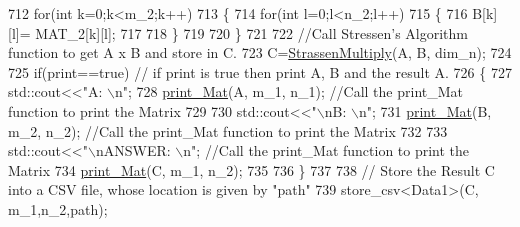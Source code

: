 \begin{DoxyCode}
712                                                         \textcolor{keywordflow}{for}(\textcolor{keywordtype}{int} k=0;k<m\_2;k++)
713                                                         \{
714                                                                 \textcolor{keywordflow}{for}(\textcolor{keywordtype}{int} l=0;l<n\_2;l++)
715                                                                 \{
716                                                                         B[k][l]= MAT\_2[k][l];
717 
718                                                                 \}
719 
720                                                         \}
721 
722                                                 \textcolor{comment}{//Call Stressen's Algorithm function to get A x B and store
       in C.}
723                                                         C=\hyperlink{classMATOPS_1_1BigMatrix_a71c665c80a1ca3731bd0d8ce37f0ace1}{StrassenMultiply}(A, B, dim\_n);
724 
725                                         \textcolor{keywordflow}{if}(print==\textcolor{keyword}{true}) \textcolor{comment}{// if print is true then print A, B and the result
       A.}
726                                                 \{
727                                                                 std::cout<<\textcolor{stringliteral}{"A: \(\backslash\)n"};
728                                                                 \hyperlink{classMATOPS_1_1BigMatrix_af5223558c09e6c3c2fd3bcc5ccd08382}{print\_Mat}(A, m\_1, n\_1); \textcolor{comment}{//Call the
       print\_Mat function to print the Matrix}
729 
730                                                                 std::cout<<\textcolor{stringliteral}{"\(\backslash\)nB: \(\backslash\)n"};
731                                                                 \hyperlink{classMATOPS_1_1BigMatrix_af5223558c09e6c3c2fd3bcc5ccd08382}{print\_Mat}(B, m\_2, n\_2); \textcolor{comment}{//Call the
       print\_Mat function to print the Matrix}
732 
733                                                                 std::cout<<\textcolor{stringliteral}{"\(\backslash\)nANSWER: \(\backslash\)n"}; \textcolor{comment}{//Call the
       print\_Mat function to print the Matrix}
734                                                                 \hyperlink{classMATOPS_1_1BigMatrix_af5223558c09e6c3c2fd3bcc5ccd08382}{print\_Mat}(C, m\_1, n\_2);
735 
736                                                 \}
737 
738                                         \textcolor{comment}{// Store the Result C into a CSV file, whose location is given by
       "path"}
739                                                 store\_csv<Data1>(C, m\_1,n\_2,path);

\end{DoxyCode}
